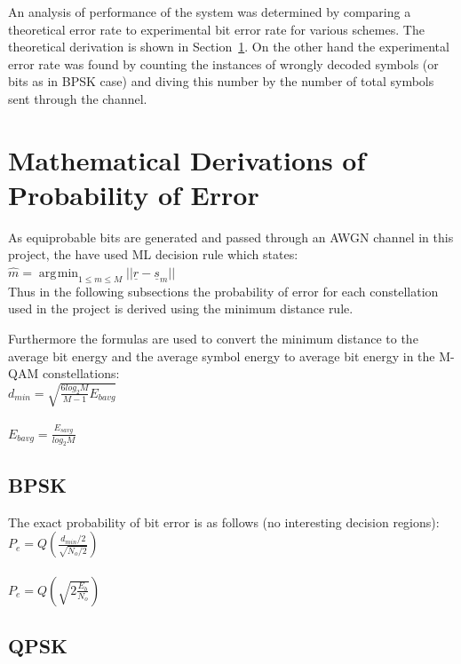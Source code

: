 \documentclass[]{article}
\DeclareMathOperator*{\argmin}{\arg\!\min}
\begin{document}
An analysis of performance of the system was determined by comparing a theoretical error rate to experimental bit error rate for various schemes.  The theoretical derivation is shown in Section~\ref{sec:deriv}. On the other hand the experimental error rate was found by counting the instances of wrongly decoded symbols (or bits as in BPSK case) and diving this number by the number of total symbols sent through the channel.  

\newpage
\section{Mathematical Derivations of Probability of Error}
\label{sec:deriv}
As equiprobable bits are generated and passed through an AWGN channel in this project, the have used ML decision rule which states: \\

$\hat{m} = \argmin_{1\leq m \leq M}{||\underline{r} - \underline{s}_m||}$ 
\\

Thus in the following subsections the probability of error for each constellation used in the project is derived using the minimum distance rule.

Furthermore the formulas are used to convert the minimum distance to the average bit energy and the average symbol energy to average bit energy in the M-QAM constellations:\\

$d_{min} = \sqrt{\frac{6log_2M}{M-1}E_{bavg}} $\\ \\

$E_{bavg} = \frac{E_{savg}}{log_2M}$



\subsection{BPSK}
\label{sec:bpsk}
The exact probability of bit error is as follows (no interesting decision regions):\\

$ P_e = Q\left(\frac{d_{min}/2}{\sqrt{N_o/2}}\right) $ \\ \\

$ P_e = Q\left(\sqrt{2\frac{E_b}{N_o}}\right) $ \\

\subsection{QPSK}
\label{sec:qpsk}
\end{document}

